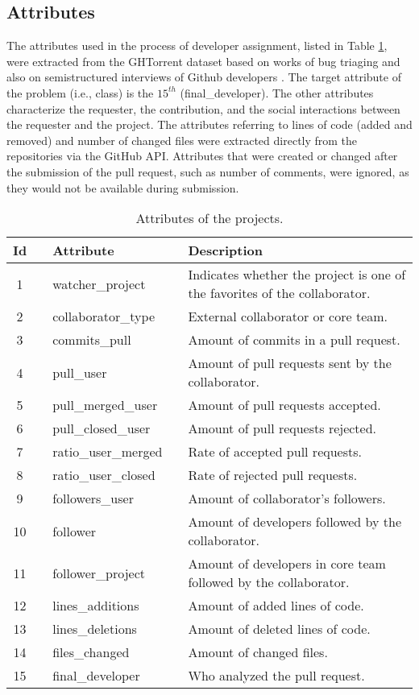 \documentclass{sig-alternate}
\begin{document}
\subsection{Attributes}
The attributes used in the process of developer assignment, listed in Table \ref{tab:Table 2}, were extracted from the GHTorrent dataset based on works of bug triaging and also on semistructured interviews of Github developers \cite{gousios_exploratory_2014}. The target attribute of the problem (i.e., class) is the $15^{th}$ (final\_developer). The other attributes characterize the requester, the contribution, and the social interactions between the requester and the project. The attributes referring to lines of code (added and removed) and number of changed files were extracted directly from the repositories via the GitHub API. Attributes that were created or changed after the submission of the pull request, such as number of comments, were ignored, as they would not be available during submission.
\vspace{-0.4cm}
\begin{table}[htb]
\caption{Attributes of the projects.}\label{tab:Table 2}
\begin{tabular}{@{}c@{} p{0.1cm}@{} p{2.3cm} l@{} p{5.3cm}@{}}
\toprule
\textbf{Id} & \textbf{} & \textbf{Attribute} & \textbf{} & \textbf{Description} \\ \midrule
1 &  & watcher\_project &  & Indicates whether the project is one of the favorites of the collaborator. \\
2 &  & collaborator\_type &  & External collaborator or core team. \\
3 &  & commits\_pull &  & Amount of commits in a pull request. \\
4 &  & pull\_user &  & Amount of pull requests sent by the collaborator. \\
5 &  & pull\_merged\_user &  & Amount of pull requests accepted. \\
6 &  & pull\_closed\_user &  & Amount of pull requests rejected. \\
7 &  & ratio\_user\_merged &  & Rate of accepted pull requests. \\
8 &  & ratio\_user\_closed &  & Rate of rejected pull requests. \\
9 &  & followers\_user &  & Amount of collaborator's followers. \\
10 &  & follower &  & Amount of developers followed by the collaborator. \\
11 &  & follower\_project &  & Amount of developers in core team followed by the collaborator. \\
12 &  & lines\_additions &  & Amount of added lines of code. \\
13 &  & lines\_deletions &  & Amount of deleted lines of code. \\
14 &  & files\_changed &  & Amount of changed files. \\ 
15 &  & final\_developer &  & Who analyzed the pull request. \\ \bottomrule
\end{tabular}
\end{table}
\end{document}
